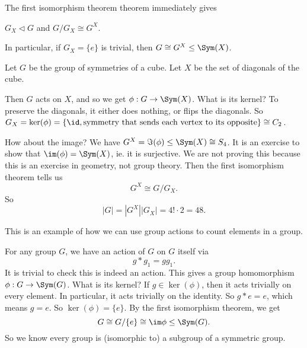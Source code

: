 \documentclass[a4paper]{article}
\begin{document}
The first isomorphism theorem theorem immediately gives
\begin{prop}
  $G_X \lhd G$ and $G/G_X \cong G^X$.
\end{prop}

In particular, if $G_X = \{e\}$ is trivial, then $G \cong G^X \leq \Sym(X)$.

\begin{eg}
  Let $G$ be the group of symmetries of a cube. Let $X$ be the set of diagonals of the cube.
  \begin{center}
  \end{center}
  Then $G$ acts on $X$, and so we get $\phi: G \to \Sym(X)$. What is its kernel? To preserve the diagonals, it either does nothing, or flips the diagonals. So $G_X = \ker(\phi) = \{\id, \text{symmetry that sends each vertex to its opposite}\} \cong C_2$.

  How about the image? We have $G^X = \Im(\phi) \leq \Sym(X) \cong S_4$. It is an exercise to show that $\im(\phi) = \Sym(X)$, ie. it is surjective. We are not proving this because this is an exercise in geometry, not group theory. Then the first isomorphism theorem tells us
  \[
    G^X \cong G/G_X.
  \]
  So
  \[
    |G| = |G^X| |G_X| = 4! \cdot 2 = 48.
  \]
\end{eg}
This is an example of how we can use group actions to count elements in a group.

\begin{eg}
  For any group $G$, we have an action of $G$ on $G$ itself via
  \[
    g * g_1 = gg_1.
  \]
  It is trivial to check this is indeed an action. This gives a group homomorphism $\phi: G \to \Sym(G)$. What is its kernel? If $g \in \ker(\phi)$, then it acts trivially on every element. In particular, it acts trivially on the identity. So $g* e = e$, which means $g = e$. So $\ker(\phi) = \{e\}$. By the first isomorphism theorem, we get
  \[
    G \cong G/\{e\} \cong \im \phi \leq \Sym(G).
  \]
  So we know every group is (isomorphic to) a subgroup of a symmetric group.
\end{eg}
\end{document}
